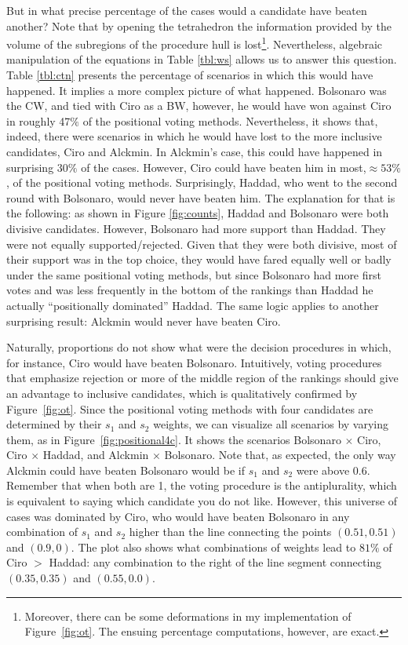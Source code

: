\documentclass[hidelinks,11pt]{article}
\begin{document}
But in what precise percentage of the cases would a candidate have beaten
another? Note that by opening the tetrahedron the information provided by the
volume of the subregions of the procedure hull is lost\footnote{Moreover, there
  can be some deformations in my implementation of Figure~\ref{fig:ot}. The
  ensuing percentage computations, however, are exact.}. Nevertheless, algebraic
manipulation of the equations in Table \ref{tbl:ws} allows us to answer this
question. Table \ref{tbl:ctn} presents the percentage of scenarios in which this
would have happened. It implies a more complex picture of what happened.
Bolsonaro was the CW, and tied with Ciro as a BW, however, he would have won
against Ciro in roughly 47\(\%\) of the positional voting methods. Nevertheless,
it shows that, indeed, there were scenarios in which he would have lost to the
more inclusive candidates, Ciro and Alckmin. In Alckmin's case, this could have
happened in surprising \(30\%\) of the cases. However, Ciro could have beaten
him in most,\(\approx 53\%\), of the positional voting methods. Surprisingly,
Haddad, who went to the second round with Bolsonaro, would never have beaten
him. The explanation for that is the following: as shown in Figure
\ref{fig:counts}, Haddad and Bolsonaro were both divisive candidates. However,
Bolsonaro had more support than Haddad. They were not equally
supported/rejected. Given that they were both divisive, most of their support
was in the top choice, they would have fared equally well or badly under the
same positional voting methods, but since Bolsonaro had more first votes and was
less frequently in the bottom of the rankings than Haddad he actually
``positionally dominated'' Haddad. The same logic applies to another surprising
result: Alckmin would never have beaten Ciro.



Naturally, proportions do not show what were the decision procedures in which,
for instance, Ciro would have beaten Bolsonaro. Intuitively, voting procedures
that emphasize rejection or more of the middle region of the rankings should
give an advantage to inclusive candidates, which is qualitatively confirmed by
Figure~\ref{fig:ot}. Since the positional voting methods with four candidates
are determined by their \(s_{1}\) and \(s_{2}\) weights, we can visualize all
scenarios by varying them, as in Figure~\ref{fig:positional4c}. It shows the
scenarios Bolsonaro \(\times\) Ciro, Ciro \(\times \) Haddad, and Alckmin
\(\times\) Bolsonaro. Note that, as expected, the only way Alckmin could have
beaten Bolsonaro would be if \(s_{1}\) and \(s_{2}\) were above 0.6. Remember
that when both are 1, the voting procedure is the antiplurality, which is
equivalent to saying which candidate you do not like. However, this universe of
cases was dominated by Ciro, who would have beaten Bolsonaro in any combination
of \(s_{1}\) and \(s_{2}\) higher than the line connecting the points
\((0.51,0.51)\) and \((0.9,0)\). The plot also shows what combinations of
weights lead to \(81\%\) of Ciro \(>\) Haddad: any combination to the right of
the line segment connecting \((0.35,0.35)\) and \((0.55,0.0)\).
\end{document}
